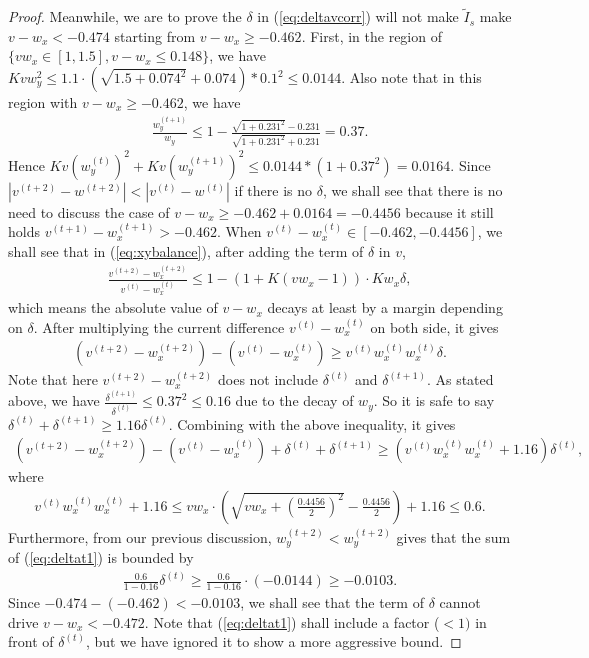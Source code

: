 \documentclass{article}
\theoremstyle{plain}
\theoremstyle{remark}
\newcommand{\T}[1]{^{(#1)}}
\def\t{^{(t)}}
\def\tt{^{(t+1)}}
\begin{document}
\begin{proof}
Meanwhile, we are to prove the $\delta$ in (\ref{eq:deltavcorr}) will not make $\tilde{I}_s$ make $v-w_x<-0.474$ starting from $v-w_x\ge -0.462$. First, in the region of $\{vw_x\in[1,1.5], v-w_x\le 0.148\}$, we have $Kvw_y^2\le 1.1\cdot(\sqrt{1.5+0.074^2}+0.074)*0.1^2\le 0.0144$. Also note that in this region with $v-w_x\ge -0.462$, we have
\begin{align}
    \frac{w_y\tt}{w_y}\le 1-\frac{\sqrt{1+0.231^2}-0.231}{\sqrt{1+0.231^2}+0.231}=0.37.
\end{align}
Hence $Kv(w_y\t)^2+Kv(w_y\tt)^2\le 0.0144*(1+0.37^2)=0.0164$. Since $|v\T{t+2}-w\T{t+2}|< |v\t-w\t|$ if there is no $\delta$, we shall see that there is no need to discuss the case of $v-w_x\ge -0.462+0.0164=-0.4456$ because it still holds $v\tt -w_x\tt>-0.462$. When $v\t-w_x\t\in[-0.462, -0.4456]$, we shall see that in (\ref{eq:xybalance}), after adding the term of $\delta$ in $v$,
\begin{align}
    \frac{v\T{t+2}-w_x\T{t+2}}{v\t-w_x\t}\le 1-(1+K(v w_x -1))\cdot K w_x \delta,
\end{align}
which means the absolute value of $v-w_x$ decays at least by a margin depending on $\delta$. After multiplying the current difference $v\t-w_x\t$ on both side, it gives
\begin{align}
    (v\T{t+2}-w_x\T{t+2})-(v\t-w_x\t) \ge v\t w_x\t w_x\t \delta.
\end{align}
Note that here $v\T{t+2}-w_x\T{t+2}$ does not include $\delta\t$ and $\delta\tt$. As stated above, we have $\frac{\delta\tt}{\delta\t}\le 0.37^2\le 0.16$ due to the decay of $w_y$. So it is safe to say $\delta\t + \delta\tt\ge 1.16\delta\t$. Combining with the above inequality, it gives
\begin{align}
    (v\T{t+2}-w_x\T{t+2})-(v\t-w_x\t) +\delta\t + \delta\tt \ge (v\t w_x\t w_x\t + 1.16)\delta\t, \label{eq:deltat1}
\end{align}
where
\begin{align}
    v\t w_x\t w_x\t + 1.16 \le  vw_x \cdot (\sqrt{vw_x +(\frac{0.4456}{2})^2}-\frac{0.4456}{2})+1.16 \le 0.6.
\end{align}
Furthermore, from our previous discussion, $w_y\T{t+2}<w_y\T{t+2}$ gives that the sum of (\ref{eq:deltat1}) is bounded by
\begin{align}
    \frac{0.6}{1-0.16}\delta\t \ge \frac{0.6}{1-0.16}\cdot (-0.0144) \ge -0.0103.
\end{align}
Since $-0.474 - (-0.462) < -0.0103$, we shall see that the term of $\delta$ cannot drive $v-w_x<-0.472$. Note that (\ref{eq:deltat1}) shall include a factor ($<1)$ in front of $\delta\t$, but we have ignored it to show a more aggressive bound.


\end{proof}
\end{document}
